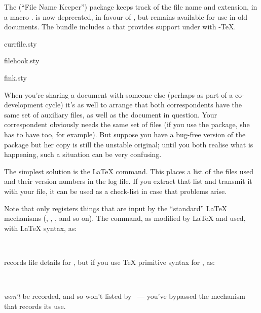 The  (``File Name Keeper'') package keeps track of the
file name and extension, in a macro .   is
now deprecated, in favour of , but remains available
for use in old documents.
%
%
The  bundle includes a  that provides
support under  with -\TeX{}.
\begin{ctanrefs}
\item[currfile.sty]
\item[filehook.sty]
\item[fink.sty]
\end{ctanrefs}


When you're sharing a document with someone else (perhaps as part of a
co-development cycle) it's as well to arrange that both correspondents
have the same set of auxiliary files, as well as the document in
question.  Your correspondent obviously needs the same set of files
(if you use the  package, she has to have 
too, for example).  But suppose you have a bug-free version of the
 package but her copy is still the unstable
original; until you both realise what is happening, such a situation
can be very confusing.

The simplest solution is the \LaTeX{}  command.  This
places a list of the files used and their version numbers in the log
file.  If you extract that list and transmit it with your file, it can
be used as a check-list in case that problems arise.

Note that  only registers things that are input by the
``standard'' \LaTeX{} mechanisms (, ,
,  and so on).
The  command, as modified by \LaTeX{} and used, with
\LaTeX{} syntax, as:
\begin{verbatim}
  
\end{verbatim}
records file details for , but if you use \TeX{}
primitive syntax for , as:
\begin{verbatim}
  
\end{verbatim}
 \emph{won't} be recorded, and so won't listed by
~--- you've bypassed the mechanism that records its use.

